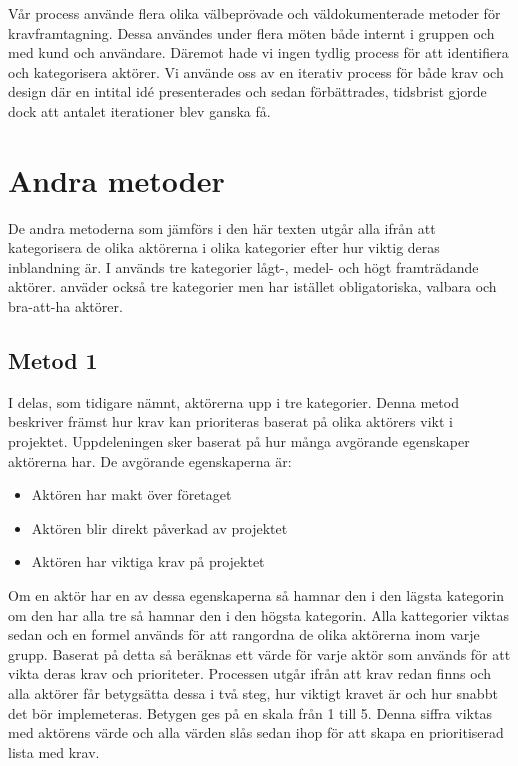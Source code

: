 Vår process använde flera olika välbeprövade och väldokumenterade metoder för kravframtagning. Dessa användes under flera möten både internt i gruppen och med kund och användare. Däremot hade vi ingen tydlig process för att identifiera och kategorisera aktörer. Vi använde oss av en iterativ process för både krav och design där en intital idé presenterades och sedan förbättrades, tidsbrist gjorde dock att antalet iterationer blev ganska få. 

\section{Andra metoder}
De andra metoderna som jämförs i den här texten utgår alla ifrån att kategorisera de olika aktörerna i olika kategorier efter hur viktig deras inblandning är. I \cite{cs_novel} används tre kategorier lågt-, medel- och högt framträdande aktörer. \cite{cs_sturctured} anväder också tre kategorier men har istället obligatoriska, valbara och bra-att-ha aktörer.

\subsection{Metod 1}
I \cite{cs_novel} delas, som tidigare nämnt, aktörerna upp i tre kategorier. Denna metod beskriver främst hur krav kan prioriteras baserat på olika aktörers vikt i projektet.
Uppdeleningen sker baserat på hur många avgörande egenskaper aktörerna har. De avgörande egenskaperna är:
\begin{itemize}
	\item Aktören har makt över företaget
	\item Aktören blir direkt påverkad av projektet
	\item Aktören har viktiga krav på projektet
\end{itemize}

Om en aktör har en av dessa egenskaperna så hamnar den i den lägsta kategorin om den har alla tre så hamnar den i den högsta kategorin. Alla kattegorier viktas sedan och en formel används för att rangordna de olika aktörerna inom varje grupp. Baserat på detta så beräknas ett värde för varje aktör som används för att vikta deras krav och prioriteter. Processen utgår ifrån att krav redan finns och alla aktörer får betygsätta dessa i två steg, hur viktigt kravet är och hur snabbt det bör implemeteras. Betygen ges på en skala från 1 till 5. Denna siffra viktas med aktörens värde och alla värden slås sedan ihop för att skapa en prioritiserad lista med krav.

